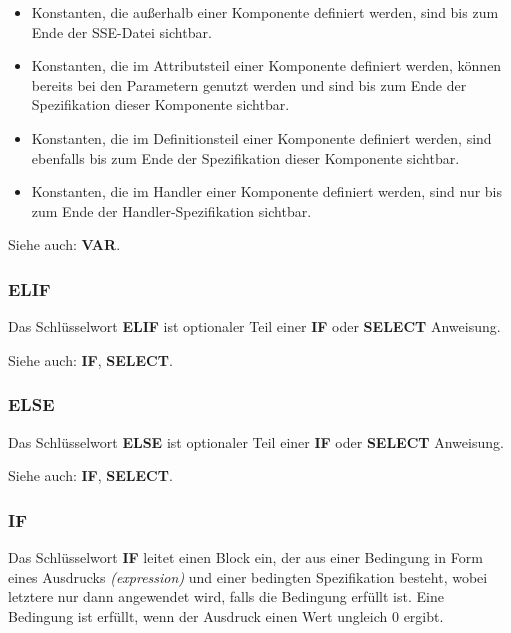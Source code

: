 \documentclass{scrartcl}
\begin{document}
\begin{itemize}
	\item Konstanten, die außerhalb einer Komponente definiert werden, sind bis zum Ende der SSE-Datei sichtbar.
	\item Konstanten, die im Attributsteil einer Komponente definiert werden, können bereits bei den Parametern genutzt werden und sind bis zum Ende der Spezifikation dieser Komponente sichtbar.
	\item Konstanten, die im Definitionsteil einer Komponente definiert werden, sind ebenfalls bis zum Ende der Spezifikation dieser Komponente sichtbar.
	\item Konstanten, die im Handler einer Komponente definiert werden, sind nur bis zum Ende der Handler-Spezifikation sichtbar.
\end{itemize}

\vspace{10pt}
\noindent Siehe auch: \textbf{VAR}.

\subsubsection{ELIF}

\noindent Das Schlüsselwort \textbf{ELIF} ist optionaler Teil einer \textbf{IF} oder \textbf{SELECT} Anweisung.

\vspace{10pt}
\noindent Siehe auch: \textbf{IF}, \textbf{SELECT}.

\subsubsection{ELSE}

\noindent Das Schlüsselwort \textbf{ELSE} ist optionaler Teil einer \textbf{IF} oder \textbf{SELECT} Anweisung.

\vspace{10pt}
\noindent Siehe auch: \textbf{IF}, \textbf{SELECT}.

\subsubsection{IF}

\noindent Das Schlüsselwort \textbf{IF} leitet einen Block ein, der aus einer Bedingung in Form eines Ausdrucks \textit{(expression)} und einer bedingten Spezifikation besteht, wobei letztere nur dann angewendet wird, falls die Bedingung erfüllt ist. Eine Bedingung ist erfüllt, wenn der Ausdruck einen Wert ungleich 0 ergibt.
\end{document}
